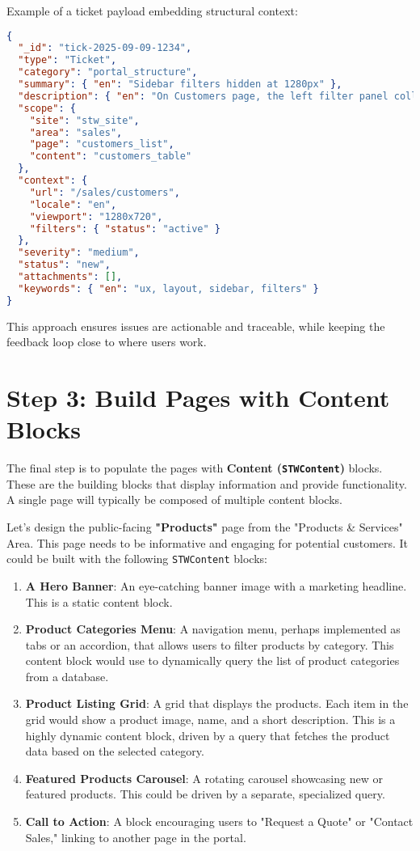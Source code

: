 Example of a ticket payload embedding structural context:
\begin{lstlisting}[language=JSON,caption={Ticket with Structural Context},label={lst:ticket-structure}]
{
  "_id": "tick-2025-09-09-1234",
  "type": "Ticket",
  "category": "portal_structure",
  "summary": { "en": "Sidebar filters hidden at 1280px" },
  "description": { "en": "On Customers page, the left filter panel collapses unexpectedly at 1280px width." },
  "scope": {
    "site": "stw_site",
    "area": "sales",
    "page": "customers_list",
    "content": "customers_table"
  },
  "context": {
    "url": "/sales/customers",
    "locale": "en",
    "viewport": "1280x720",
    "filters": { "status": "active" }
  },
  "severity": "medium",
  "status": "new",
  "attachments": [],
  "keywords": { "en": "ux, layout, sidebar, filters" }
}
\end{lstlisting}

This approach ensures issues are actionable and traceable, while keeping the feedback loop close to where users work.

\section{Step 3: Build Pages with Content Blocks}
\label{sec:build-with-content}

The final step is to populate the pages with \textbf{Content (\texttt{STWContent})} blocks. These are the building blocks that display information and provide functionality. A single page will typically be composed of multiple content blocks.

Let's design the public-facing \textbf{"Products"} page from the "Products \& Services" Area. This page needs to be informative and engaging for potential customers. It could be built with the following \texttt{STWContent} blocks:

\begin{enumerate}
    \item \textbf{A Hero Banner}: An eye-catching banner image with a marketing headline. This is a static content block.
    \item \textbf{Product Categories Menu}: A navigation menu, perhaps implemented as tabs or an accordion, that allows users to filter products by category. This content block would use \wbpl{} to dynamically query the list of product categories from a database.
    \item \textbf{Product Listing Grid}: A grid that displays the products. Each item in the grid would show a product image, name, and a short description. This is a highly dynamic content block, driven by a \wbpl{} query that fetches the product data based on the selected category.
    \item \textbf{Featured Products Carousel}: A rotating carousel showcasing new or featured products. This could be driven by a separate, specialized query.
    \item \textbf{Call to Action}: A block encouraging users to "Request a Quote" or "Contact Sales," linking to another page in the portal.
\end{enumerate}

